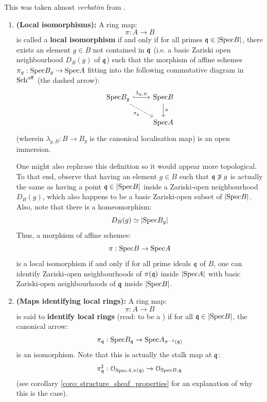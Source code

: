            \begin{definition} \label{def: local_isomorphisms_and_maps_identifying_local_rings}
                This was taken almost \textit{verbatim} from \cite[\href{https://stacks.math.columbia.edu/tag/096E}{Tag 096E}]{stacks}.
                \begin{enumerate}
                    \item \textbf{(Local isomorphisms):} A ring map:
                        $$\pi: A \to B$$
                    is called a \textbf{local isomorphism} if and only if for all primes $\mathfrak{q} \in |\mathrm{Spec} B|$, there exists an element $g \in B$ not contained in $\mathfrak{q}$ (i.e. a basic Zariski open neighbourhood $D_B(g)$ of $\mathfrak{q}$) such that the  morphism of affine schemes $\pi_g: \mathrm{Spec} B_g \to \mathrm{Spec} A$ fitting into the following commutative diagram in $\mathrm{Sch}^{\mathrm{aff}}$ (the dashed arrow):
                        $$
                            \begin{tikzcd}
                            	{\Spec B_g} & {\Spec B} \\
                            	{} & {\Spec A}
                            	\arrow["\pi", from=1-2, to=2-2]
                            	\arrow["{\lambda_{g, B}}", hook, from=1-1, to=1-2]
                            	\arrow["{\pi_g}"', dashed, from=1-1, to=2-2]
                            \end{tikzcd}
                        $$
                    (wherein $\lambda_{g, B}: B \to B_g$ is the canonical localisation map) is an open immersion.
                    
                    One might also rephrase this definition so it would appear more topological. To that end, observe that having an element $g \in B$ such that $\mathfrak{q} \not \ni g$ is actually the same as having a point $\mathfrak{q} \in |\mathrm{Spec} B|$ inside a Zariski-open neighbourhood $D_B(g)$, which also happens to be a basic Zariski-open subset of $|\mathrm{Spec} B|$. Also, note that there is a homeomorphism:
                        $$D_B(g) \simeq |\mathrm{Spec} B_g|$$
                    Thus, a morphism of affine schemes:
                        $$\pi: \mathrm{Spec} B \to \mathrm{Spec} A$$
                    is a local isomorphism if and only if for all prime ideals $\mathfrak{q}$ of $B$, one can identify Zariski-open neighbourhoods of $\pi(\mathfrak{q})$ inside $|\mathrm{Spec} A|$ with basic Zariski-open neighbourhoods of $\mathfrak{q}$ inside $|\mathrm{Spec} B|$. 
                    \item \textbf{(Maps identifying local rings):} A ring map:
                        $$\pi: A \to B$$
                    is said to \textbf{identify local rings} (read: to be a ) if for all $\mathfrak{q} \in |\mathrm{Spec} B|$, the canonical arrow:
                        $$\pi_{\mathfrak{q}}: \mathrm{Spec} B_{\mathfrak{q}} \to \mathrm{Spec} A_{\pi^{-1}(\mathfrak{q})}$$
                    is an isomorphism. Note that this is actually the stalk map at $\mathfrak{q}$:
                        $$\pi^{\sharp}_{\mathfrak{q}}: \mathcal{O}_{\mathrm{Spec} A, \pi(\mathfrak{q})} \to \mathcal{O}_{\mathrm{Spec} B, \mathfrak{q}}$$
                    (see corollary \ref{coro: structure_sheaf_properties} for an explanation of why this is the case).
                \end{enumerate}
            \end{definition}
            
